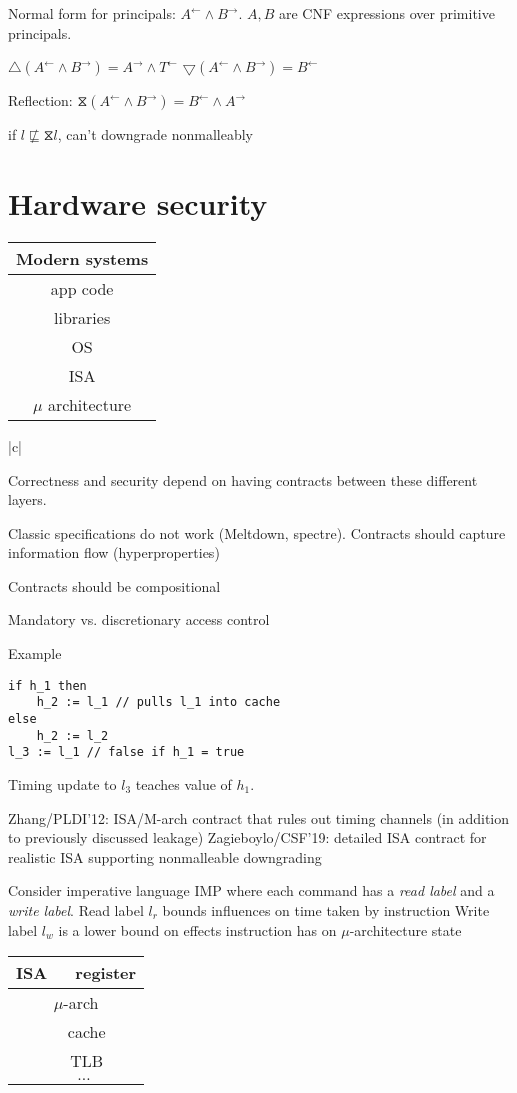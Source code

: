 \documentclass{article}
\newcommand{\la}{^{\leftarrow}}
\newcommand{\ra}{^{\rightarrow}}
\newcommand{\refl}{\hourglass}
\begin{document}
Normal form for principals: $A^{\leftarrow} \land B^{\rightarrow}$.
$A,B$ are CNF expressions over primitive principals.

$\bigtriangleup (A \la \land B \ra) = A \ra \land T \la$
$\bigtriangledown (A \la \land B \ra) = B \la$

Reflection: $ \refl (A \la \land B \ra) = B \la \land A \ra$

if $l \not\sqsubseteq \refl l$, can't downgrade nonmalleably

\section{Hardware security}
\begin{tabular}{|c|}
Modern systems \\
\hline
app code \\
\hline
libraries \\ 
\hline
OS \\
\hline
ISA \\ 
\hline
$\mu$ architecture \\
\end{tabular}{|c|}

Correctness and security depend on having contracts between these different layers. 

Classic specifications do not work (Meltdown, spectre). Contracts should capture information flow (hyperproperties)

Contracts should be compositional

Mandatory vs. discretionary access control

Example
\begin{lstlisting}[mathescape]
if h_1 then
    h_2 := l_1 // pulls l_1 into cache
else 
    h_2 := l_2
l_3 := l_1 // false if h_1 = true
\end{lstlisting}

Timing update to $l_3$ teaches value of $h_1$.

Zhang/PLDI'12: ISA/M-arch contract that rules out timing channels (in addition to previously discussed leakage)
Zagieboylo/CSF'19: detailed ISA contract for realistic ISA supporting nonmalleable downgrading

Consider imperative language IMP where each command has a \emph{read label} and a \emph{write label}.
Read label $l_r$ bounds influences on time taken by instruction
Write label $l_w$ is a lower bound on effects instruction has on $\mu$-architecture state
\begin{tabular}{|c|}
\hline
ISA
$\quad$ register \\
\hline
$\mu$-arch \\
$\quad$ cache \\
$\quad$ TLB \\
$\quad \ldots$ \\
\hline
\end{tabular}
\end{document}
